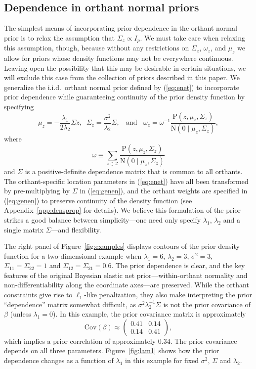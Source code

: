 \documentclass[12pt]{article}
\begin{document}
\subsection{Dependence in orthant normal priors}\label{sec:dep}
The simplest means of incorporating prior dependence in the orthant normal prior is
to relax the assumption that $\Sigma_z \propto I_p$. We must take care when relaxing this assumption, 
though, because without any restrictions on $\Sigma_z$, 
$\omega_z$, and $\mu_z$ we allow for priors whose density functions may not be 
everywhere continuous.  Leaving open the possibility that this may be desirable in certain situations, 
we will exclude this case from the collection of priors described in this paper.
We generalize the i.i.d.~orthant normal prior defined by (\ref{eq:enet}) to incorporate prior 
dependence while guaranteeing continuity of the prior density function by
specifying
\begin{equation}
	\mu_z = -\frac{\lambda_1}{2\lambda_2}\Sigma z, 
	\;\; \Sigma_z = \frac{\sigma^2}{\lambda_2} \Sigma,
	\;\;\mbox{   and   }\;\; \omega_z = \omega^{-1} \frac{\mbox{P}(z, \mu_z, \Sigma_z)}
		{\mbox{N}(0 \mid \mu_z, \Sigma_z)},
	\label{eq:genen}
\end{equation}
where
\[
	\omega \equiv \sum_{z \in \mathcal{Z}}  \frac{\mbox{P}(z, \mu_z, \Sigma_z)}
		{\mbox{N}(0 \mid \mu_z, \Sigma_z)}
\]
and $\Sigma$ is a positive-definite dependence matrix that is common to all
orthants.  
The orthant-specific location parameters in (\ref{eq:enet}) have
all been transformed by pre-multiplying by $\Sigma$ in (\ref{eq:genen}), and the
orthant weights are specified in (\ref{eq:genen}) to preserve continuity of the density function
(see Appendix~\ref{app:densprop} for details).
We believe this formulation of the prior strikes a good balance between simplicity---one need only
specify $\lambda_1$, $\lambda_2$ and a single matrix $\Sigma$---and 
flexibility.

The right panel of Figure~\ref{fig:examples} displays contours of the prior density function
for a two-dimensional example when $\lambda_1 = 6$, $\lambda_2 = 3$, $\sigma^2 = 3$,
$\Sigma_{11} = \Sigma_{22} = 1$ and $\Sigma_{12} = \Sigma_{21} = 0.6$.  The prior dependence
is clear, %
and the key features of the original Bayesian elastic net prior---within-orthant normality and 
non-differentiability along the coordinate axes---are preserved. While the orthant constraints 
give rise to $\ell_1$-like penalization, they also make interpreting the prior ``dependence'' 
matrix somewhat difficult, as $\sigma^2\lambda_2^{-1}\Sigma$ is not the prior covariance of 
$\beta$ (unless $\lambda_1 = 0$).  In this example, the prior covariance matrix is approximately
\[
	\mbox{Cov}(\beta) \approx \left( \begin{array}{ll} 0.41 & 0.14 \\ 0.14 & 0.41 \end{array}\right),
\]
which implies a prior correlation of approximately $0.34$.  The prior covariance depends
on all three parameters.  Figure~\ref{fig:lam1} shows how the prior dependence
changes as a function of $\lambda_1$ in this example for fixed $\sigma^2$, $\Sigma$ and $\lambda_2$.
\end{document}
